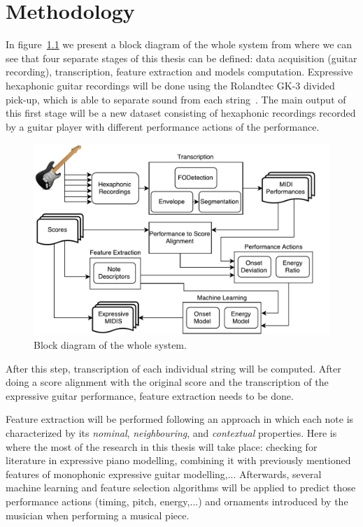 \chapter{Methodology}
\label{chap:methods}
In figure~\ref{fig:diagram} we present a block diagram of the whole system from where we can see that four separate stages of this thesis can be defined: data acquisition (guitar recording), transcription, feature extraction and models computation. Expressive hexaphonic guitar recordings will be done using the Rolandtec GK-3 divided pick-up, which is able to separate sound from each string~\cite{Angulo2016}. The main output of this first stage will be a new dataset consisting of hexaphonic recordings recorded by a guitar player with different performance actions of the performance. 

\begin{figure}[ht!]
\caption{Block diagram of the whole system.}
\label{fig:diagram}
\centering
\includegraphics[width=\textwidth]{Figures/Diagram.pdf}
\end{figure}

After this step, transcription of each individual string will be computed. After doing a score alignment with the original score and the transcription of the expressive guitar performance, feature extraction needs to be done.

Feature extraction will be performed following an approach in which each note is characterized by its \textit{nominal}, \textit{neighbouring}, and \textit{contextual} properties.  Here is where the most of the research in this thesis will take place:  checking for literature in expressive piano modelling, combining it with previously mentioned features of monophonic expressive guitar modelling,... Afterwards, several machine learning and feature selection algorithms will be applied to predict those performance actions (timing, pitch, energy,...) and ornaments introduced by the musician when performing a musical piece.

